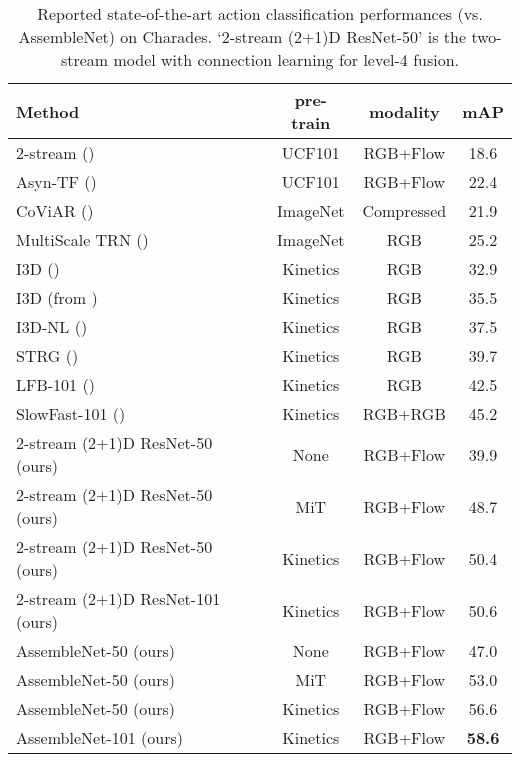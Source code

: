 \documentclass{article} \usepackage{iclr2020_conference,times}
\begin{document}
\begin{table}[t]
    \setlength\tabcolsep{2pt}
    \caption{Reported state-of-the-art action classification performances (vs. AssembleNet) on Charades. `2-stream (2+1)D ResNet-50' is the two-stream model with connection learning for level-4 fusion.}
    \label{tab:charades}
\centering
    \begin{tabular}{lccc}
    \toprule
       Method & pre-train & modality & mAP \\
    \midrule
    2-stream (\citealp{simonyan2014two})  & UCF101 & RGB+Flow & 18.6 \\
    Asyn-TF (\citealp{sigurdsson2016asynchronous}) & UCF101 & RGB+Flow & 22.4 \\
    CoViAR (\citealp{wu2018compressed}) & ImageNet & Compressed & 21.9 \\
    MultiScale TRN (\citealp{zhou2018temporal}) & ImageNet &  RGB & 25.2 \\
    I3D (\citealp{carreira2017quo}) & Kinetics & RGB & 32.9 \\
    I3D (from \citealp{wang2018non}) & Kinetics & RGB & 35.5 \\
    I3D-NL (\citealp{wang2018non}) & Kinetics & RGB & 37.5 \\
STRG (\citealp{wang2018videos}) & Kinetics & RGB & 39.7 \\
    LFB-101 (\citealp{wu2018long}) & Kinetics & RGB & 42.5 \\
    SlowFast-101 (\citealp{feichtenhofer2018slowfast}) & Kinetics & RGB+RGB & 45.2 \\
\hline
    2-stream (2+1)D ResNet-50 (ours) & None & RGB+Flow & 39.9 \\
    2-stream (2+1)D ResNet-50 (ours) & MiT & RGB+Flow & 48.7 \\
2-stream (2+1)D ResNet-50 (ours) & Kinetics & RGB+Flow & 50.4 \\
    2-stream (2+1)D ResNet-101 (ours) & Kinetics & RGB+Flow & 50.6 \\
    \hline
    AssembleNet-50 (ours) & None & RGB+Flow & 47.0 \\
    AssembleNet-50 (ours) & MiT & RGB+Flow & 53.0 \\
AssembleNet-50 (ours) & Kinetics & RGB+Flow & 56.6 \\
    AssembleNet-101 (ours) & Kinetics & RGB+Flow & \textbf{58.6} \\
    \bottomrule
    \end{tabular}
\end{table}
\end{document}
